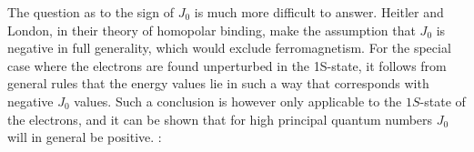 \begin{paper}{1}
The question as to the sign of $J_0$ is much more difficult to answer. Heitler and London, in their theory of homopolar binding, make the assumption that $J_0$ is negative in full generality, which would exclude ferromagnetism. For the special case where the electrons are found unperturbed in the 1S-state, it follows from general rules that the energy values lie in such a way that corresponds with negative $J_0$ values. Such a conclusion is however only applicable to the $1S$-state of the electrons, and it can be shown that for high principal quantum numbers $J_0$ will in general be positive. :

\end{paper}

